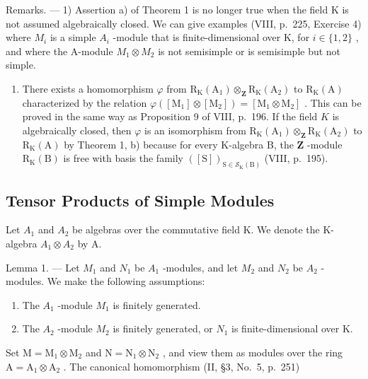 Remarks. --- 1) Assertion a) of Theorem 1 is no longer true when the field K is not assumed algebraically closed. We can give examples (VIII, p.~225, Exercise 4) where \(M_{i}\) is a simple \(A_{i}\) -module that is finite-dimensional over K, for \(i \in \{1, 2\}\) , and where the A-module \(M_{1} \otimes M_{2}\) is not semisimple or is semisimple but not simple.

\begin{enumerate}
\def\labelenumi{\arabic{enumi})}
\setcounter{enumi}{1}
\tightlist
\item
  There exists a homomorphism \(\varphi\) from \(\mathrm{R_K(A_1)\otimes_{\mathbf{Z}} R_K(A_2)}\) to \(\mathrm{R_K(A)}\) characterized by the relation \(\varphi ([\mathrm{M}_1]\otimes [\mathrm{M}_2]) = [\mathrm{M}_1\otimes \mathrm{M}_2]\) . This can be proved in the same way as Proposition 9 of VIII, p.~196. If the field \(K\) is algebraically closed, then \(\varphi\) is an isomorphism from \(\mathrm{R_K(A_1)\otimes_{\mathbf{Z}} R_K(A_2)}\) to \(\mathrm{R_K(A)}\) by Theorem 1, b) because for every K-algebra B, the \(\mathbf{Z}\) -module \(\mathrm{R_K(B)}\) is free with basis the family \(([\mathrm{S}])_{\mathrm{S}\in \mathcal{S}_{\mathrm{K}}(\mathrm{B})}\) (VIII, p.~195).
\end{enumerate}

\subsection{Tensor Products of Simple Modules}

Let \(A_{1}\) and \(A_{2}\) be algebras over the commutative field K. We denote the K-algebra \(A_{1} \otimes A_{2}\) by A.

Lemma 1. --- Let \(M_{1}\) and \(N_{1}\) be \(A_{1}\) -modules, and let \(M_{2}\) and \(N_{2}\) be \(A_{2}\) -modules. We make the following assumptions:

\begin{enumerate}
\def\labelenumi{(\roman{enumi})}
\item
  The \(A_{1}\) -module \(M_{1}\) is finitely generated.
\item
  The \(A_{2}\) -module \(M_{2}\) is finitely generated, or \(N_{1}\) is finite-dimensional over K.
\end{enumerate}

Set \(\mathrm{M} = \mathrm{M}_1\otimes \mathrm{M}_2\) and \(\mathrm{N} = \mathrm{N}_1\otimes \mathrm{N}_2\) , and view them as modules over the ring \(\mathrm{A} = \mathrm{A}_1\otimes \mathrm{A}_2\) . The canonical homomorphism (II, §3, No.~5, p.~251)

